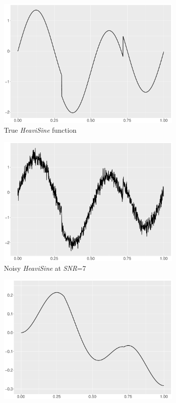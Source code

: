 \begin{figure}
    \centering
    \begin{subfigure}{0.45\textwidth}
    \centering
    \includegraphics[width=\linewidth,height=0.45\textwidth]{Chapters/02TractorSplineTheory/plot/ggplot/ggHeaviSine.pdf}
    \caption{True \textit{HeaviSine} function}
    \end{subfigure}%
    \begin{subfigure}{0.45\textwidth}
    \centering
    \includegraphics[width=\linewidth,height=0.45\textwidth]{Chapters/02TractorSplineTheory/plot/ggplot/ggHeaviSineNoise.pdf}
    \caption{Noisy \textit{HeaviSine} at \textit{SNR}=7}
    \end{subfigure}
    \begin{subfigure}{0.45\textwidth}
    \centering
    \includegraphics[width=\linewidth,height=0.45\textwidth]{Chapters/02TractorSplineTheory/plot/ggplot/ggHeaviSinePosition.pdf}

\end{subfigure}
\end{figure}
